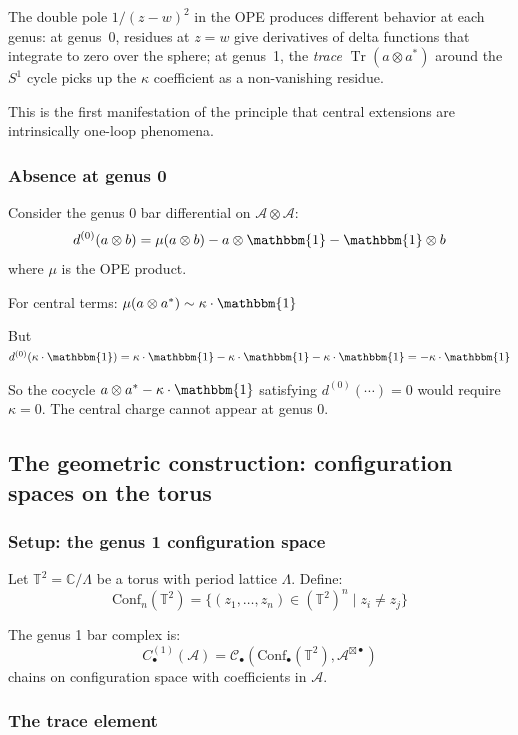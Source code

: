 The double pole $1/(z-w)^2$ in the OPE produces different behavior at each genus: at genus~0, residues at $z=w$ give derivatives of delta functions that integrate to zero over the sphere; at genus~1, the \emph{trace} $\operatorname{Tr}(a \otimes a^*)$ around the $S^1$ cycle picks up the $\kappa$ coefficient as a non-vanishing residue.

This is the first manifestation of the principle that central extensions are intrinsically one-loop phenomena.

\subsubsection{Absence at genus 0}

Consider the genus 0 bar differential on $\mathcal{A} \otimes \mathcal{A}$:
\[d^{(0)}(a \otimes b) = \mu(a \otimes b) - a \otimes \mathbbm{1} - \mathbbm{1} \otimes b\]
where $\mu$ is the OPE product.

For central terms: $\mu(a \otimes a^*) \sim \kappa \cdot \mathbbm{1}$

But $d^{(0)}(\kappa \cdot \mathbbm{1}) = \kappa \cdot \mathbbm{1} - \kappa \cdot \mathbbm{1} - \kappa \cdot \mathbbm{1} = -\kappa \cdot \mathbbm{1}$

So the cocycle $a \otimes a^* - \kappa \cdot \mathbbm{1}$ satisfying $d^{(0)}(\cdots) = 0$
would require $\kappa = 0$. The central charge cannot appear at genus 0.

\subsection{The geometric construction: configuration spaces on the torus}

\subsubsection{Setup: the genus 1 configuration space}

Let $\mathbb{T}^2 = \mathbb{C}/\Lambda$ be a torus with period lattice $\Lambda$.
Define:
\[\mathrm{Conf}_n(\mathbb{T}^2) = \{ (z_1, \ldots, z_n) \in (\mathbb{T}^2)^n \mid z_i \neq z_j \}\]

The genus 1 bar complex is:
\[C_{\bullet}^{(1)}(\mathcal{A}) = \mathcal{C}_{\bullet}(\mathrm{Conf}_{\bullet}(\mathbb{T}^2), 
\mathcal{A}^{\boxtimes \bullet})\]
chains on configuration space with coefficients in $\mathcal{A}$.

\subsubsection{The trace element}

